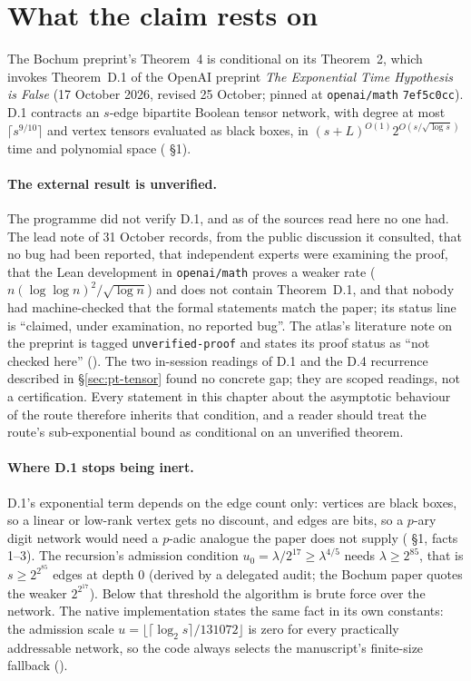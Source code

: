 \section{What the claim rests on}\label{sec:tn-conditional}

The Bochum preprint's Theorem~4 is conditional on its Theorem~2, which
invokes Theorem~D.1 of the OpenAI preprint \emph{The Exponential Time
Hypothesis is False} (17 October 2026, revised 25 October; pinned at
\texttt{openai/math} \texttt{7ef5c0cc}). D.1 contracts an $s$-edge
bipartite Boolean tensor network, with degree at most $\lceil s^{9/10}\rceil$
and vertex tensors evaluated as black boxes, in
$(s+L)^{O(1)}2^{O(s/\sqrt{\log s})}$ time and polynomial space
( \S1).

\paragraph{The external result is unverified.} The programme did not
verify D.1, and as of the sources read here no one had. The lead note of 31
October records, from the public discussion it consulted, that no bug had
been reported, that independent experts were examining the proof, that the
Lean development in \texttt{openai/math} proves a weaker rate
($n(\log\log n)^2/\sqrt{\log n}$) and does not contain Theorem~D.1, and that
nobody had machine-checked that the formal statements match the paper; its
status line is ``claimed, under examination, no reported bug''. The
atlas's literature note on the preprint is tagged
\texttt{unverified-proof} and states its proof status as ``not checked here''
(). The two
in-session readings of D.1 and the D.4 recurrence described in
\S\ref{sec:pt-tensor} found no concrete gap; they are scoped readings, not a
certification. Every statement in this chapter about the asymptotic
behaviour of the route therefore inherits that condition, and a reader
should treat the route's sub-exponential bound as conditional on an
unverified theorem.

\paragraph{Where D.1 stops being inert.} D.1's exponential term depends on
the edge count only: vertices are black boxes, so a linear or low-rank
vertex gets no discount, and edges are bits, so a $p$-ary digit network
would need a $p$-adic analogue the paper does not supply
( \S1, facts 1--3). The
recursion's admission condition $u_0=\lambda/2^{17}\ge\lambda^{4/5}$ needs
$\lambda\ge2^{85}$, that is $s\ge2^{2^{85}}$ edges at depth 0 (derived by a
delegated audit; the Bochum paper quotes the weaker $2^{2^{17}}$). Below
that threshold the algorithm is brute force over the network. The native
implementation states the same fact in its own constants: the admission
scale $u=\lfloor\lceil\log_2s\rceil/131072\rfloor$ is zero for every
practically addressable network, so the code always selects the
manuscript's finite-size fallback ().

